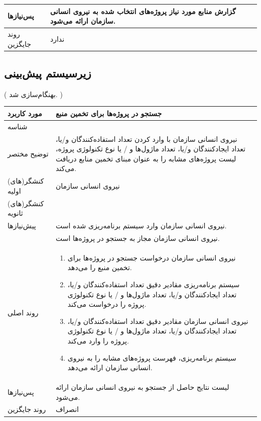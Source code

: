 \begin{table}[H]
\begin{tabular}{|p{3cm}|p{10cm}|}
		پس‌نیازها &
		گزارش منابع مورد نیاز پروژه‌های انتخاب شده به نیروی انسانی سازمان ارائه می‌شود. \\
		\hline
		
		روند جایگزین
		& ندارد \\
		\hline
		
	\end{tabular}
\end{table}

\subsection{زیرسیستم پیش‌بینی}

\newpage
({\color{red} بهنگام‌سازی شد. })
\begin{table}[H]
	\centering
	\begin{tabular}{|p{3cm}|p{10cm}|}
		\hline
		مورد کاربرد & جستجو در پروژه‌ها برای تخمین منبع  \\
		\hline
		شناسه & 
		\stepcounter{usecase_ID}
		\arabic{usecase_ID} \\
		\hline
		توضیح مختصر & نیروی انسانی سازمان با وارد کردن تعداد استفاده‌کنندگان و/یا، تعداد ایجادکنندگان و/یا، تعداد ماژول‌ها و / یا نوع تکنولوژی پروژه، لیست پروژه‌های مشابه را به عنوان مبنای تخمین منابع دریافت می‌کند. \\
		\hline
		کنشگر(های) اولیه & نیروی انسانی سازمان \\
		\hline
		کنشگر(های) ثانویه &  \\
		\hline
		پیش‌نیازها & نیروی انسانی سازمان وارد سیستم برنامه‌ریزی شده است. \\
		& نیروی انسانی سازمان مجاز به جستجو در پروژه‌ها است. \\
		\hline
				
		روند اصلی &
		\begin{enumerate}[topsep=0cm,leftmargin=0.5cm]
			\item نیروی انسانی سازمان درخواست جستجو در پروژه‌ها برای تخمین منبع را می‌دهد.
			\item سیستم برنامه‌ریزی مقادیر  دقیق تعداد استفاده‌کنندگان و/یا، تعداد ایجادکنندگان و/یا، تعداد ماژول‌ها و / یا نوع تکنولوژی پروژه را درخواست می‌کند.
			\item نیروی انسانی سازمان مقادیر دقیق تعداد استفاده‌کنندگان و/یا، تعداد ایجادکنندگان و/یا، تعداد ماژول‌ها و / یا نوع تکنولوژی پروژه را وارد می‌کند. 
			\item سیستم برنامه‌ریزی، فهرست پروژه‌های مشابه را به نیروی انسانی سازمان ارائه می‌دهد. 
		\end{enumerate} \\
		
		\hline
		
		
		پس‌نیازها & لیست نتایج حاصل از جستجو به نیروی انسانی سازمان ارائه می‌شود. \\
		\hline
		
		
		روند جایگزین & انصراف \\
		\hline
	\end{tabular}
\end{table}

